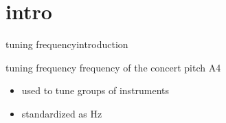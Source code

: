     \section[intro]{intro}
       \begin{frame}{tuning frequency}{introduction}
            \begin{block}{tuning frequency}
                    frequency of the concert pitch A4
            \end{block}
            \bigskip
            \begin{itemize}
                \item   used to tune groups of instruments
                \item   standardized as \unit[440]{Hz}
             \end{itemize}
        \end{frame}
        
